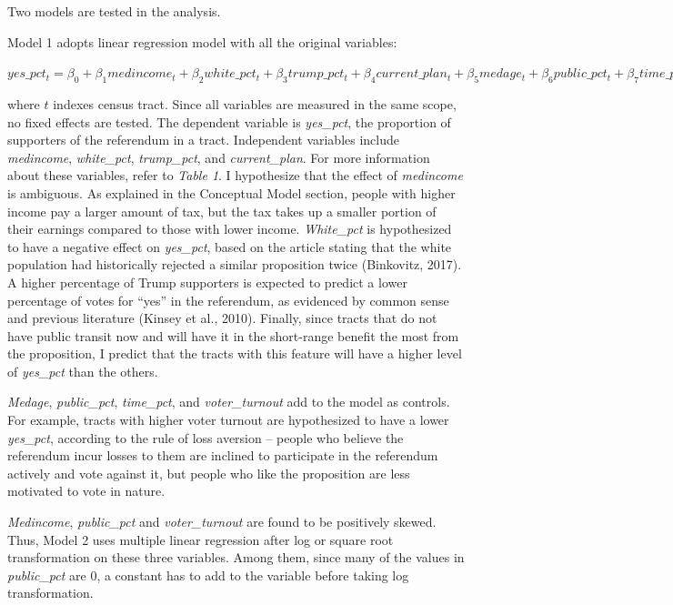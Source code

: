 \documentclass[
]{article}
\begin{document}
Two models are tested in the analysis.

Model 1 adopts linear regression model with all the original variables:

\(yes\_pct_t = \beta_0+\beta_1medincome_t+\beta_2white\_pct_t+\beta_3trump\_pct_t+\beta_4current\_plan_t+\beta_5medage_t+\beta_6public\_pct_t+\beta_7time\_pct_t+\beta_8voter\_turnout_t+\epsilon_t\)

where \(t\) indexes census tract. Since all variables are measured in
the same scope, no fixed effects are tested. The dependent variable is
\emph{yes\_pct}, the proportion of supporters of the referendum in a
tract. Independent variables include \emph{medincome},
\emph{white\_pct}, \emph{trump\_pct}, and \emph{current\_plan}. For more
information about these variables, refer to \emph{Table 1}. I
hypothesize that the effect of \emph{medincome} is ambiguous. As
explained in the Conceptual Model section, people with higher income pay
a larger amount of tax, but the tax takes up a smaller portion of their
earnings compared to those with lower income. \emph{White\_pct} is
hypothesized to have a negative effect on \emph{yes\_pct}, based on the
article stating that the white population had historically rejected a
similar proposition twice (Binkovitz, 2017). A higher percentage of
Trump supporters is expected to predict a lower percentage of votes for
``yes'' in the referendum, as evidenced by common sense and previous
literature (Kinsey et al., 2010). Finally, since tracts that do not have
public transit now and will have it in the short-range benefit the most
from the proposition, I predict that the tracts with this feature will
have a higher level of \emph{yes\_pct} than the others.

\emph{Medage}, \emph{public\_pct}, \emph{time\_pct}, and
\emph{voter\_turnout} add to the model as controls. For example, tracts
with higher voter turnout are hypothesized to have a lower
\emph{yes\_pct}, according to the rule of loss aversion -- people who
believe the referendum incur losses to them are inclined to participate
in the referendum actively and vote against it, but people who like the
proposition are less motivated to vote in nature.

\emph{Medincome}, \emph{public\_pct} and \emph{voter\_turnout} are found
to be positively skewed. Thus, Model 2 uses multiple linear regression
after log or square root transformation on these three variables. Among
them, since many of the values in \emph{public\_pct} are 0, a constant
has to add to the variable before taking log transformation.
\end{document}
